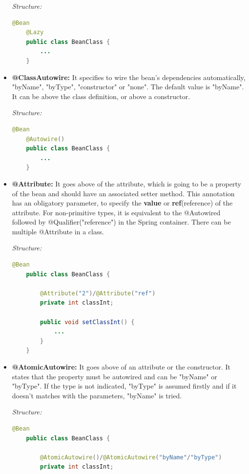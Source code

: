 \documentclass[a4paper, 12pt, notitlepage]{report}
\begin{document}
\begin{itemize}
    \textit{Structure:}
    \begin{lstlisting}[numbers = none, language = Java]
    @Bean
    @Lazy
    public class BeanClass {
        ...
    }
    \end{lstlisting}
    
    \item \textbf{@ClassAutowire:} It specifies to wire the bean's dependencies automatically, "byName", "byType", "constructor" or "none". The default value is "byName". It can be above the class definition, or above a constructor. 
    
    \textit{Structure:}
    \begin{lstlisting}[numbers = none, language = Java]
    @Bean
    @Autowire()
    public class BeanClass {
        ...
    }
    \end{lstlisting}
    
    \item \textbf{@Attribute:} It goes above of the attribute, which is going to be a property of the bean and should have an associated setter method. This annotation has an obligatory parameter, to specify the \textbf{value} or \textbf{ref}(reference) of the attribute. For non-primitive types, it is equivalent to the @Autowired followed by @Qualifier("reference") in the Spring container. There can be multiple @Attribute in a class.
    
    \textit{Structure:}
    \begin{lstlisting}[numbers = none, language = Java]
    @Bean
    public class BeanClass {
	
	    @Attribute("2")/@Attribute("ref")
        private int classInt;

        public void setClassInt() {
            ...
        }
    }

    \end{lstlisting}
    
        \item \textbf{@AtomicAutowire:} It goes above of an  attribute or the constructor. It states that the property must be autowired and can be "byName" or "byType". If the type is not indicated, "byType" is assumed firstly and if it doesn't matches with the parameters, "byName" is tried. 
    
    \textit{Structure:}
    \begin{lstlisting}[numbers = none, language = Java]
    @Bean
    public class BeanClass {
	
	    @AtomicAutowire()/@AtomicAutowire("byName"/"byType")
        private int classInt;


\end{lstlisting}
\end{itemize}
\end{document}
